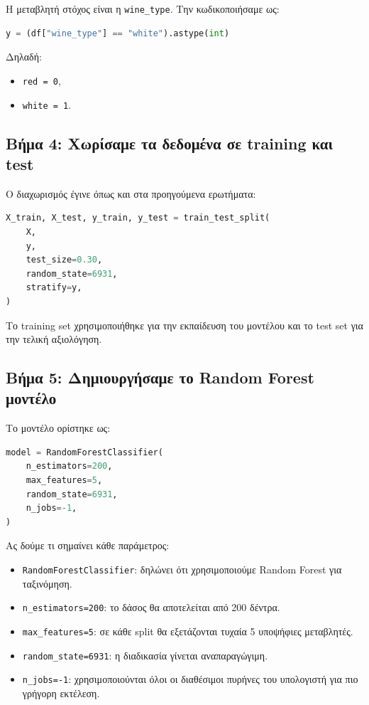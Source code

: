 \documentclass[12pt,a4paper]{article}
\newcommand{\code}[1]{\texttt{\textenglish{#1}}}
\begin{document}
Η μεταβλητή στόχος είναι η \code{wine\_type}. Την κωδικοποιήσαμε ως:

\begin{lstlisting}[language=Python]
y = (df["wine_type"] == "white").astype(int)
\end{lstlisting}

Δηλαδή:

\begin{itemize}[nosep]
    \item \code{red = 0},
    \item \code{white = 1}.
\end{itemize}

\subsection{Βήμα 4: Χωρίσαμε τα δεδομένα σε training και test}

Ο διαχωρισμός έγινε όπως και στα προηγούμενα ερωτήματα:

\begin{lstlisting}[language=Python]
X_train, X_test, y_train, y_test = train_test_split(
    X,
    y,
    test_size=0.30,
    random_state=6931,
    stratify=y,
)
\end{lstlisting}

Το training set χρησιμοποιήθηκε για την εκπαίδευση του μοντέλου και το test
set για την τελική αξιολόγηση.

\subsection{Βήμα 5: Δημιουργήσαμε το Random Forest μοντέλο}

Το μοντέλο ορίστηκε ως:

\begin{lstlisting}[language=Python]
model = RandomForestClassifier(
    n_estimators=200,
    max_features=5,
    random_state=6931,
    n_jobs=-1,
)
\end{lstlisting}

Ας δούμε τι σημαίνει κάθε παράμετρος:

\begin{itemize}
    \item \code{RandomForestClassifier}: δηλώνει ότι χρησιμοποιούμε Random
    Forest για ταξινόμηση.
    \item \code{n\_estimators=200}: το δάσος θα αποτελείται από 200 δέντρα.
    \item \code{max\_features=5}: σε κάθε split θα εξετάζονται τυχαία 5
    υποψήφιες μεταβλητές.
    \item \code{random\_state=6931}: η διαδικασία γίνεται αναπαραγώγιμη.
    \item \code{n\_jobs=-1}: χρησιμοποιούνται όλοι οι διαθέσιμοι πυρήνες του
    υπολογιστή για πιο γρήγορη εκτέλεση.
\end{itemize}
\end{document}
